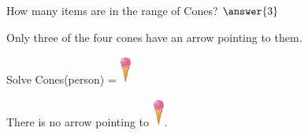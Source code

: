 \documentclass{ximera}
\begin{document}
\begin{exercise}
How many items are in the range of Cones? $\answer{3}$
  \begin{feedback}
Only three of the four cones have an arrow pointing to them.
  \end{feedback}
\end{exercise}







\begin{exercise}
 Solve Cones(person) = {\includegraphics[width=15px,height=35px]{pics/elements/cones/cones4.png}}
  \begin{multipleChoice}
  \end{multipleChoice}
  \begin{feedback}
There is no arrow pointing to {\includegraphics[width=15px,height=35px]{pics/elements/cones/cones4.png}}.
  \end{feedback}
\end{exercise}
\end{document}
